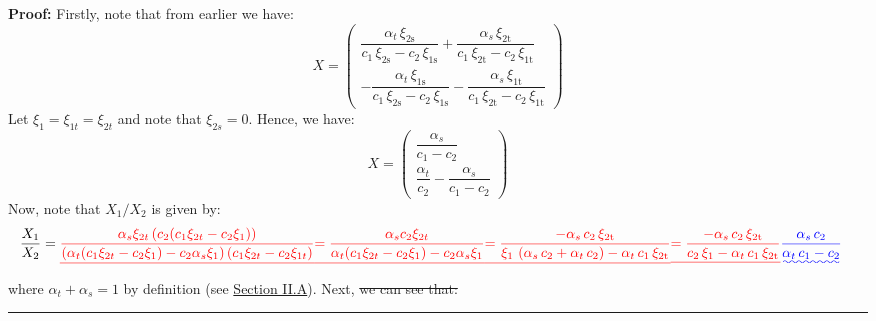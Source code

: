 \documentclass[11pt,a4paper,leqno]{extarticle}
\newenvironment{proof}[1][Proof]{\noindent\textbf{#1:} }{\ \rule{0.5em}{0.5em}}
\providecommand{\DIFadd}[1]{{\protect\color{blue}\uwave{#1}}} %
\providecommand{\DIFdel}[1]{{\protect\color{red}\sout{#1}}}                      %
\providecommand{\DIFaddbegin}{} %
\providecommand{\DIFaddend}{} %
\providecommand{\DIFdelbegin}{} %
\providecommand{\DIFdelend}{} %
\begin{document}
\begin{proof}
	Firstly, note that from earlier we have:
	$$
	X = \begin{pmatrix}
	\dfrac{\alpha _{t}\,\xi _{\mathrm{2s}}}{c_{1}\,\xi _{\mathrm{2s}}-c_{2}\,\xi _{\mathrm{1s}}}+\dfrac{\alpha _{s}\,\xi _{\mathrm{2t}}}{c_{1}\,\xi _{\mathrm{2t}}-c_{2}\,\xi _{\mathrm{1t}}} \\[2ex] 
	-\dfrac{\alpha _{t}\,\xi _{\mathrm{1s}}}{c_{1}\,\xi _{\mathrm{2s}}-c_{2}\,\xi _{\mathrm{1s}}}-\dfrac{\alpha _{s}\,\xi _{\mathrm{1t}}}{c_{1}\,\xi _{\mathrm{2t}}-c_{2}\,\xi _{\mathrm{1t}}}
	\end{pmatrix}
	$$
	Let $\xi_1 = \xi_{1t} = \xi_{2t}$ and note that $\xi_{2s} = 0$. Hence, we have:
	$$
	X = \DIFdelbegin %
	\DIFdelend \DIFaddbegin \begin{pmatrix}
	\dfrac{\alpha_s}{c_1 - c_2} \\[2ex] 
	\dfrac{\alpha_t}{c_2} - \dfrac{\alpha_s}{c_1 - c_2}
	\end{pmatrix}\DIFaddend 
	$$
	Now, note that $X_1/X_2$ is given by:
	\begin{align*}
	\frac{X_1}{X_2} &= \DIFdelbegin \DIFdel{\frac{\alpha_s \xi_{2t} \left( c_2 ( c_1 \xi_{2t} - c_2 \xi_{1} ) \right)}{ \left( \alpha_t (c_1 \xi_{2t} - c_2 \xi_{1}) -  c_2 \alpha_s \xi_1 \right) (c_1 \xi_{2t} - c_2 \xi_{1t})}  }%
	\DIFdel{= \frac{\alpha_s c_2 \xi_{2t}}{ \alpha_t (c_1 \xi_{2t} - c_2 \xi_{1}) -  c_2 \alpha_s \xi_1 }}%
	\DIFdel{= \frac{-\alpha _{s}\,c_{2}\,\xi _{\mathrm{2t}}}{\xi _{1}\,\left(\alpha _{s}\,c_{2}+\alpha _{t}\,c_{2}\right)-\alpha _{t}\,c_{1}\,\xi _{\mathrm{2t}}} }%
	\DIFdel{= \frac{-\alpha _{s}\,c_{2}\,\xi _{\mathrm{2t}}}{c_2\,\xi_1-\alpha _{t}\,c_{1}\,\xi _{\mathrm{2t}}}
	}\DIFdelend \DIFaddbegin \DIFadd{\frac{\alpha _{s}\,c_{2}}{\alpha _{t}\,c_{1} - c_2}
	}\DIFaddend \end{align*}
	where $\alpha_t + \alpha_s = 1$ by definition (see \hyperref[sec:consumers]{Section II.A}).  Next, \DIFdelbegin \DIFdel{we can see that:
}
\end{proof}
\end{document}
